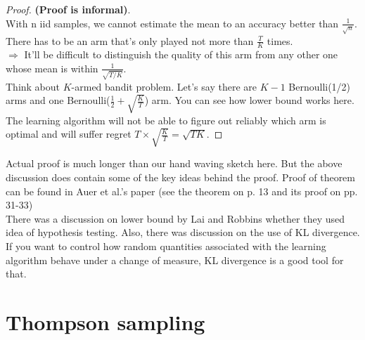 \documentclass[11pt]{article}
\begin{document}
\begin{proof}
\textbf{(Proof is informal)}.\\ With n iid samples, we cannot estimate the mean to an accuracy better than $\frac{1}{\sqrt{n}}$. There has to be an arm that's only played not more than $\frac{T}{K}$ times.\\
$\Rightarrow$ It'll be difficult to distinguish the quality of this arm from any other one whose mean is within $\frac{1}{\sqrt{T/K}}$.\\

\noindent  Think about $K$-armed bandit problem. Let's say there are $K-1$ Bernoulli(1/2) arms and one Bernoulli($\frac{1}{2}+\sqrt{\frac{K}{T}}$) arm. You can see how lower bound works here. The learning 
algorithm will not be able to figure out reliably which arm is optimal and will suffer regret $T \times \sqrt{\frac{K}{T}} = \sqrt{TK}$.
\end{proof}
\noindent Actual proof is much longer than our hand waving sketch here. But the above discussion does contain some of the key ideas behind the proof. Proof of theorem can be found in Auer et al.'s paper \cite{auer2002nonstochastic} (see the theorem on p. 13 and its proof on pp. 31-33)\\
There was a discussion on lower bound by Lai and Robbins \cite{lai1985asymptotically} whether they used idea of hypothesis testing. Also, there was discussion on the use of KL divergence. If you want to control how random quantities associated with the learning algorithm behave under a change of measure, KL divergence is  a good tool for that.

\section{Thompson sampling}
\end{document}
